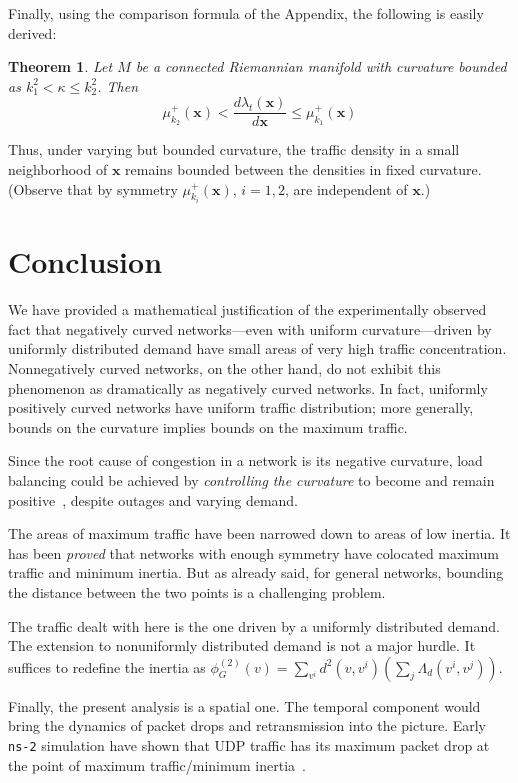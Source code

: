\documentclass{article}
\newcommand{\x}{{\mathbf x}}
\newtheorem{theorem}{Theorem}
\begin{document}
Finally, using the comparison formula of the Appendix, the following is easily derived:
\begin{theorem}
Let $M$ be a connected Riemannian manifold with curvature bounded as $k_1^2 < \kappa \leq k_2^2$. 
Then
$$ \mu^+_{k_2}(\x) < \frac{d\lambda_t(\x)}{d\x} \leq \mu^+_{k_1}(\x) $$
\end{theorem}
\noindent
Thus, under varying but bounded curvature, 
the traffic density in a small neighborhood of $\x$ remains bounded 
between the densities in fixed curvature. 
(Observe that by symmetry $\mu^+_{k_i}(\x)$, $i=1,2$,  are independent of $\x$.) 

\section{Conclusion}

We have provided a mathematical justification of the experimentally observed fact that 
negatively curved networks---even with uniform curvature---driven by uniformly distributed demand 
have small areas of very high traffic concentration. 
Nonnegatively curved networks, on the other hand, do not exhibit this phenomenon 
as dramatically as negatively curved networks.  
In fact, uniformly positively curved networks have uniform traffic distribution; 
more generally, bounds on the curvature implies bounds on the maximum traffic. 

Since the root cause of congestion in a network is its negative curvature, load balancing could be achieved 
by {\it controlling the curvature} to become and remain positive~\cite{mingjithesis}, despite outages 
and varying demand. 

The areas of maximum traffic have been narrowed down to areas of low inertia.  
It has been {\it proved} that networks with enough symmetry  
have colocated maximum traffic and minimum inertia. 
But as already said, for general networks, bounding the distance between the two points is a challenging problem. 

The traffic dealt with here is the one driven by a uniformly distributed demand. 
The extension to nonuniformly distributed demand is not a major hurdle. 
It suffices to redefine the inertia as $\phi^{(2)}_G(v)=\sum_{v^i}d^2(v,v^i)\left(\sum_j \Lambda_d(v^i,v^j)\right)$. 

Finally, the present analysis is a spatial one. 
The temporal component would bring the dynamics of packet drops and retransmission into the picture. 
Early {\tt ns-2} simulation have shown that UDP traffic has its  
maximum packet drop at the point of maximum traffic/minimum inertia~\cite{mingjithesis}. 
\end{document}
